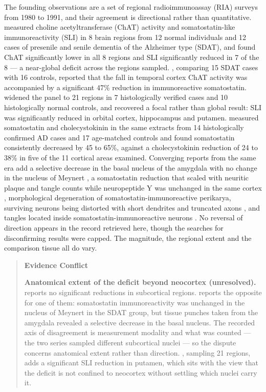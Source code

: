 \documentclass[11pt]{article}
\begin{document}
The founding observations are a set of regional radioimmunoassay (RIA) surveys from 1980 to 1991, and their agreement is directional rather than quantitative. \citet{Davies1981} measured choline acetyltransferase (ChAT) activity and somatostatin-like immunoreactivity (SLI) in 8 brain regions from 12 normal individuals and 12 cases of presenile and senile dementia of the Alzheimer type (SDAT), and found ChAT significantly lower in all 8 regions and SLI significantly reduced in 7 of the 8 --- a near-global deficit across the regions sampled. \citet{Rossor1980}, comparing 15 SDAT cases with 16 controls, reported that the fall in temporal cortex ChAT activity was accompanied by a significant 47\% reduction in immunoreactive somatostatin. \citet{Arai1984} widened the panel to 21 regions in 7 histologically verified cases and 10 histologically normal controls, and recovered a focal rather than global result: SLI was significantly reduced in orbital cortex, hippocampus and putamen. \citet{Mazurek1991} measured somatostatin and cholecystokinin in the same extracts from 14 histologically confirmed AD cases and 17 age-matched controls and found somatostatin consistently decreased by 45 to 65\%, against a cholecystokinin reduction of 24 to 38\% in five of the 11 cortical areas examined. Converging reports from the same era add a selective decrease in the basal nucleus of the amygdala with no change in the nucleus of Meynert \citep{Candy1985}, a somatostatin reduction that scaled with neuritic plaque and tangle counts while neuropeptide Y was unchanged in the same cortex \citep{Dawbarn1986}, morphological degeneration of somatostatin-immunoreactive perikarya, surviving neurons being distorted with short dendrites and truncated axons \citep{ChanPalay1987}, and tangles located inside somatostatin-immunoreactive neurons \citep{Roberts1985}. No reversal of direction appears in the record retrieved here, though the searches for disconfirming results were capped. The magnitude, the regional extent and the comparison tissue all do vary.

\begin{quote}
\noindent\textbf{Evidence Conflict}\par
\textbf{Anatomical extent of the deficit beyond neocortex (unresolved).} \citet{Beal1986a} reports no significant reductions in subcortical regions. \citet{Candy1985} reports the opposite for one of them: somatostatin immunoreactivity was unchanged in the nucleus of Meynert in the SDAT group, but tissue punches taken from the amygdala revealed a selective decrease in the basal nucleus. The recorded axis of disagreement is measurement modality and what was counted --- the two series sampled different subcortical nuclei --- so the dispute concerns anatomical extent rather than direction. \citet{Arai1984}, sampling 21 regions, adds a significant SLI reduction in putamen, which sits with the view that the deficit is not confined to neocortex without settling which nuclei carry it.

\end{quote}
\end{document}
